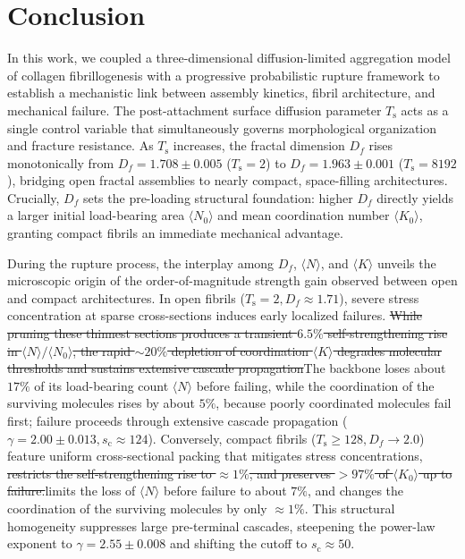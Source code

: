 \documentclass[aps,physrev,preprint,groupedaddress,linenumbers]{revtex4-2}
\newcommand{\added}[1]{{\color{red}#1}}
\newcommand{\deleted}[1]{{\color{red}\sout{#1}}}
\begin{document}
\section{Conclusion}
In this work, we coupled a three-dimensional diffusion-limited aggregation model of collagen fibrillogenesis with a progressive probabilistic rupture framework to establish a mechanistic link between assembly kinetics, fibril architecture, and mechanical failure. The post-attachment surface diffusion parameter $T_{\mathrm{s}}$ acts as a single control variable that simultaneously governs morphological organization and fracture resistance. As $T_{\mathrm{s}}$ increases, the fractal dimension $D_f$ rises monotonically from $D_f = 1.708 \pm 0.005$ ($T_{\mathrm{s}}=2$) to $D_f = 1.963 \pm 0.001$ ($T_{\mathrm{s}}=8192$), bridging open fractal assemblies to nearly compact, space-filling architectures. Crucially, $D_f$ sets the pre-loading structural foundation: higher $D_f$ directly yields a larger initial load-bearing area $\langle N_0 \rangle$ and mean coordination number $\langle K_0 \rangle$, granting compact fibrils an immediate mechanical advantage.

During the rupture process, the interplay among $D_f$, $\langle N \rangle$, and $\langle K \rangle$ unveils the microscopic origin of the order-of-magnitude strength gain observed between open and compact architectures. In open fibrils ($T_{\mathrm{s}}=2, D_f \approx 1.71$), severe stress concentration at sparse cross-sections induces early localized failures. \deleted{While pruning these thinnest sections produces a transient $6.5\%$ self-strengthening rise in $\langle N \rangle / \langle N_0 \rangle$, the rapid $\sim 20\%$ depletion of coordination $\langle K \rangle$ degrades molecular thresholds and sustains extensive cascade propagation}\added{The backbone loses about $17\%$ of its load-bearing count $\langle N \rangle$ before failing, while the coordination of the surviving molecules rises by about $5\%$, because poorly coordinated molecules fail first; failure proceeds through extensive cascade propagation} ($\gamma = 2.00 \pm 0.013, s_{\mathrm{c}} \approx 124$). Conversely, compact fibrils ($T_{\mathrm{s}} \ge 128, D_f \to 2.0$) feature uniform cross-sectional packing that mitigates stress concentrations, \deleted{restricts the self-strengthening rise to $\approx 1\%$, and preserves $>97\%$ of $\langle K_0 \rangle$ up to failure.}\added{limits the loss of $\langle N \rangle$ before failure to about $7\%$, and changes the coordination of the surviving molecules by only $\approx 1\%$.} This structural homogeneity suppresses large pre-terminal cascades, steepening the power-law exponent to $\gamma = 2.55 \pm 0.008$ and shifting the cutoff to $s_{\mathrm{c}} \approx 50$.
\end{document}
